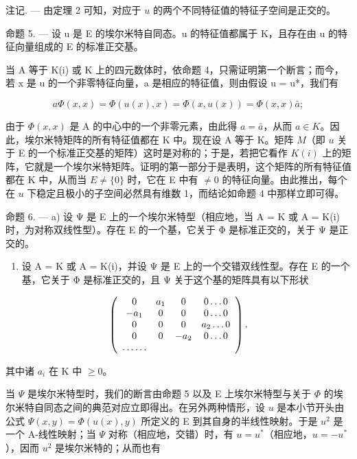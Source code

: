 注记. --- 由定理 2 可知，对应于 \(u\) 的两个不同特征值的特征子空间是正交的。

命题 5. --- 设 u 是 E 的埃尔米特自同态。u 的特征值都属于 K，且存在由 u 的特征向量组成的 E 的标准正交基。

当 A 等于 K(i) 或 K 上的四元数体时，依命题 4，只需证明第一个断言；而今，若 x 是 u 的一个非零特征向量，a 是相应的特征值，则由假设 u = u*，我们有

\[
a \Phi (x, x) = \Phi (u (x), x) = \Phi (x, u (x)) = \Phi (x, x) \bar {a};
\]

由于 \(\Phi(x, x)\) 是 A 的中心中的一个非零元素，由此得 \(a = \bar{a}\)，从而 \(a \in K\)。因此，埃尔米特矩阵的所有特征值都在 K 中。现在设 A 等于 K。矩阵 \(M\)（即 \(u\) 关于 E 的一个标准正交基的矩阵）这时是对称的；于是，若把它看作 \(K(i)\) 上的矩阵，它就是一个埃尔米特矩阵。证明的第一部分于是表明，这个矩阵的所有特征值都在 K 中，从而当 \(E \neq \{0\}\) 时，它在 E 中有 \(\neq 0\) 的特征向量。由此推出，每个在 \(u\) 下稳定且极小的子空间必然具有维数 1，而结论如命题 4 中那样立即可得。

命题 6. --- a) 设 Ψ 是 E 上的一个埃尔米特型（相应地，当 A = K 或 A = K(i) 时，为对称双线性型）。存在 E 的一个基，它关于 Φ 是标准正交的，关于 Ψ 是正交的。

\begin{enumerate}
\def\labelenumi{\alph{enumi})}
\setcounter{enumi}{1}
\tightlist
\item
  设 A = K 或 A = K(i)，并设 Ψ 是 E 上的一个交错双线性型。存在 E 的一个基，它关于 Φ 是标准正交的，且 Ψ 关于这个基的矩阵具有以下形状
\end{enumerate}

\[
\left( \begin{array}{c c c c} 0 & a _ {1} & 0 & 0 \ldots 0 \\ - a _ {1} & 0 & 0 & 0 \ldots 0 \\ 0 & 0 & 0 & a _ {2} \ldots 0 \\ 0 & 0 & - a _ {2} & 0 \ldots 0 \\ \ldots \ldots \end{array} \right).
\]

其中诸 \(a_{i}\) 在 K 中 \(\geqslant 0\)。

当 \(\Psi\) 是埃尔米特型时，我们的断言由命题 5 以及 E 上埃尔米特型与关于 \(\Phi\) 的埃尔米特自同态之间的典范对应立即得出。在另外两种情形，设 \(u\) 是本小节开头由公式 \(\Psi(x, y) = \overline{\Phi(u(x), y)}\) 所定义的 E 到其自身的半线性映射。于是 \(u^2\) 是一个 A-线性映射；当 \(\Psi\) 对称（相应地，交错）时，有 \(u = u^*\)（相应地，\(u = -u^*\)），因而 \(u^2\) 是埃尔米特的；从而也有

